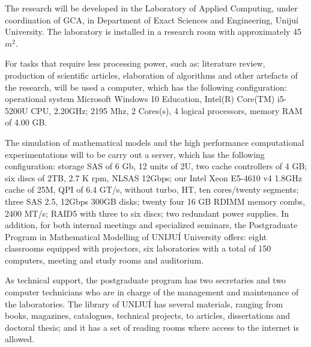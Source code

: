 \label{cap:infrastructure}
\noindent
The research will be developed in the Laboratory of Applied Computing, under coordination of GCA, in Department of Exact Sciences and Engineering, Uniju\'{i} University. The laboratory is installed in a research room with approximately 45 $m^2$.

For tasks that require less processing power, such as: literature review, production of scientific articles, elaboration of algorithms and other artefacts of the research,  will be used a computer, which has the following configuration: operational system Microsoft Windows 10 Education, Intel(R) Core(TM) i5-5200U CPU, 2.20GHz; 2195 Mhz, 2 Cores(s), 4 logical processors, memory RAM of 4.00 GB.

The simulation of mathematical models and the high performance computational experimentations will to be carry out a server, which has the following configuration: storage SAS of 6 Gb, 12 units of 2U, two cache controllers of 4 GB; six discs of 2TB, 2.7 K rpm, NLSAS 12Gbps; our Intel Xeon E5-4610 v4 1.8GHz cache of 25M, QPI of 6.4 GT/s, without turbo, HT, ten cores/twenty segments; three SAS 2.5, 12Gbps 300GB disks; twenty four 16 GB RDIMM memory combs, 2400 MT/s; RAID5 with three to six discs; two redundant power supplies.
In addition, for both internal meetings and specialized seminars, the Postgraduate Program in Mathematical Modelling of UNIJUÍ University offers: eight classrooms equipped with projectors, six laboratories with a total of 150 computers, meeting and study rooms and auditorium.

As technical support, the postgraduate program has two secretaries and two computer technicians who are in charge of the management and maintenance of the laboratories. The library of UNIJUÍ has several materials, ranging from books, magazines, catalogues, technical projects, to articles, dissertations and doctoral thesis; and it has a set of reading rooms where access to the internet is allowed.



